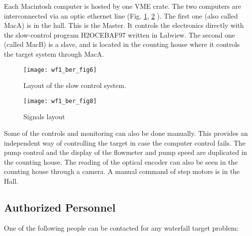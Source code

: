 Each Macintosh computer is hosted by one VME crate. The two computers are
interconnected via an optic ethernet line
(Fig. \ref{fig:control1}, \ref{fig:control2} ). 
The first one (also called MacA) is in the hall. This is the Master.
It controls the electronics directly with the slow-control program H2OCEBAF97 
written in Labview.
The second one (called MacB) is a slave, and is located in 
the counting house where it controls the target system through MacA.

\begin{figure}[hp]
\begin{center}
\texttt{[image: wf1\_ber\_fig6]}
\caption[Waterfall Target: Slow Controls]{Layout of the slow control system.}
\label{fig:control1}
\end{center}
\end{figure}
 
\begin{figure}[hp]
\begin{center}
\texttt{[image: wf1\_ber\_fig8]}
\caption[Waterfall Target: Signal Layout]{Signals layout}
\label{fig:control2}
\end{center}
\end{figure}


Some of the controls and monitoring can also be done manually. This provides 
an independent way of controlling the target in case 
the computer control fails.
The pump control and the display of the flowmeter and pump speed are 
duplicated in the counting house. The reading of the optical encoder 
can also be seen in the counting house through a camera.
A manual command of step motors is in the Hall.


\subsection{Authorized Personnel}

One of the following people can be contacted for any waterfall target problem:

